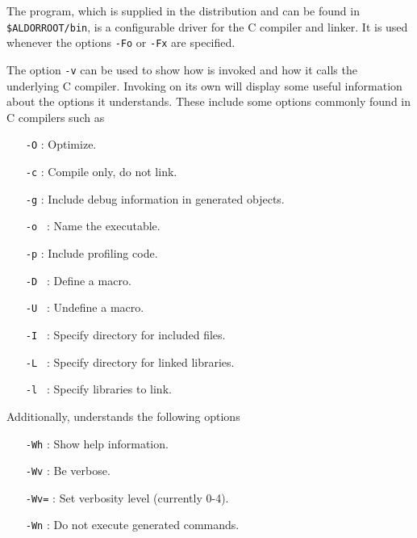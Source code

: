 %

\newcommand{\uoption}[1]{{\tt #1}}


The \uniclcmd{} program, which is supplied in the distribution and
can be found in {\tt \$ALDORROOT/bin}, is a configurable driver for 
the C compiler and linker. It is used whenever the \asharpcmd{} options \uoption{-Fo} or 
\uoption{-Fx} are specified.

The \asharpcmd{} option \uoption{-v} can be used to show how \uniclcmd{}
is invoked and how it calls the underlying C compiler. Invoking \uniclcmd{}
on its own will display some useful information about the options it understands.
These include some options commonly found in C compilers such as 
\begin{itemize}
\item [\uoption{-O} :] Optimize.
\item [\uoption{-c} :] Compile only, do not link.
\item [\uoption{-g} :] Include debug information in generated objects.
\item [\uoption{-o \meta{name}} :] Name the executable.
\item [\uoption{-p} :] Include profiling code.
\item [\uoption{-D \meta{def}} :] Define a macro.
\item [\uoption{-U \meta{undef}} :] Undefine a macro.
\item [\uoption{-I \meta{dir}} :] Specify directory for included files.
\item [\uoption{-L \meta{dir}} :] Specify directory for linked libraries.
\item [\uoption{-l \meta{lib}} :] Specify libraries to link.
\end{itemize}

Additionally, \uniclcmd{} understands the following options

\begin{itemize}
\item [\uoption{-Wh} :] Show help information.
\item [\uoption{-Wv} :] Be verbose.
\item [\uoption{-Wv=\meta{n}} :] Set verbosity level (currently 0-4).
\item [\uoption{-Wn} :] Do not execute generated commands.
\end{itemize}

